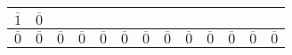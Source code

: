 \begin{solution}
\begin{center}
\begin{tabular}{|c||c|c|c|c|c|c|c|c|c|c|c|c|}
            \( \overline{1} \) &
            \( \overline{0} \) \\
            \hline
            \( \overline{0} \) &
            \( \overline{0} \) &
            \( \overline{0} \) &
            \( \overline{0} \) &
            \( \overline{0} \) &
            \( \overline{0} \) &
            \( \overline{0} \) &
            \( \overline{0} \) &
            \( \overline{0} \) &
            \( \overline{0} \) &
            \( \overline{0} \) &
            \( \overline{0} \) &
            \( \overline{0} \) \\
            \hline
        \end{tabular}
    \end{center}
\end{solution}
